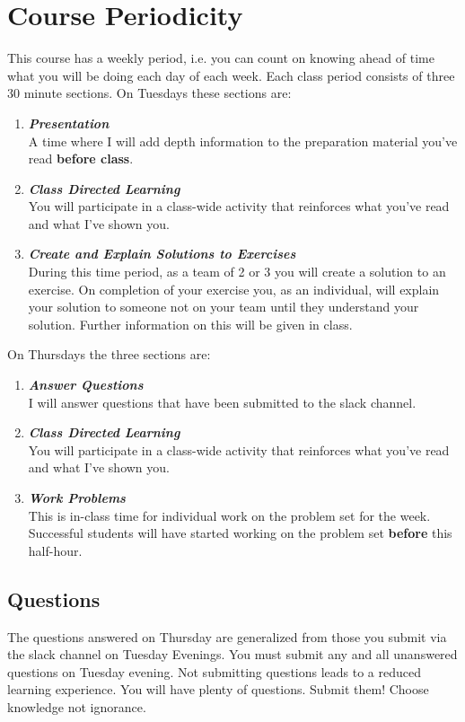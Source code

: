 \documentclass[12pt]{amsart}
\begin{document}
\section{Course Periodicity}
This course has a weekly period, i.e. you can count on knowing ahead of time what you will be doing each day of each week.
Each class period consists of three 30 minute sections. On Tuesdays these sections are:
\begin{enumerate}
	\item \textit{\textbf{Presentation}} \\A time where I will add depth information to the preparation material you've read \textbf{before class}. 
	\item \textit{\textbf{Class Directed Learning}}\\You will participate in a class-wide activity that reinforces what you've read and what I've shown you.
	\item \textit{\textbf{Create and Explain Solutions to Exercises}}\\During this time period, as a team of 2 or 3 you will create a solution to an exercise. On completion of your exercise you, as an individual, will explain your solution to someone not on your team until they understand your solution. Further information on this will be given in class.
\end{enumerate}
On Thursdays the three sections are:
\begin{enumerate}
	\item \textit{\textbf{Answer Questions}}\\ I will answer questions that have been submitted to the slack channel.
	\item \textit{\textbf{Class Directed Learning}}\\You will participate in a class-wide activity that reinforces what you've read and what I've shown you.
	\item \textit{\textbf{Work Problems}}\\This is in-class time for individual work on the problem set for the week. Successful students will have started working on the problem set \textbf{before} this half-hour.
\end{enumerate}

\subsection{Questions} The questions answered on Thursday are generalized from those you submit via the slack channel on Tuesday Evenings. You must submit any and all unanswered questions on Tuesday evening. Not submitting questions leads to a reduced learning experience. You will have plenty of questions. Submit them! Choose knowledge not ignorance.
\end{document}
